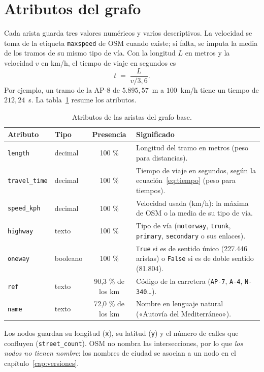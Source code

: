 \section{Atributos del grafo}

Cada arista guarda tres valores numéricos y varios descriptivos. La velocidad se toma de la etiqueta \texttt{maxspeed} de OSM cuando existe; si falta, se imputa la media de los tramos
de su mismo tipo de vía. Con la longitud $L$ en metros y la velocidad $v$ en km/h, el tiempo de viaje en segundos es
\begin{equation}\label{eq:tiempo}
  t\;=\;\frac{L}{v/3{,}6}.
\end{equation}
Por ejemplo, un tramo de la AP-8 de $5.895{,}57$~m a $100$~km/h tiene un tiempo de $212{,}24$~s. La tabla~\ref{tab:atributos} resume los atributos.

\begin{table}[htbp]
  \centering
  \caption{Atributos de las aristas del grafo base.}\label{tab:atributos}
  \small
  \begin{tabularx}{\linewidth}{@{}l l c X@{}}
    \toprule
    Atributo & Tipo & Presencia & Significado \\
    \midrule
    \texttt{length} & decimal & 100 \% & Longitud del tramo en metros (peso para distancias). \\
    \texttt{travel\_time} & decimal & 100 \% & Tiempo de viaje en segundos, según la ecuación~\eqref{eq:tiempo} (peso para tiempos). \\
    \texttt{speed\_kph} & decimal & 100 \% & Velocidad usada (km/h): la máxima de OSM o la media de su tipo de vía. \\
    \texttt{highway} & texto & 100 \% & Tipo de vía (\texttt{motorway}, \texttt{trunk}, \texttt{primary}, \texttt{secondary} o sus enlaces). \\
    \texttt{oneway} & booleano & 100 \% & \texttt{True} si es de sentido único (227.446 aristas) o \texttt{False} si es de doble sentido (81.804). \\
    \texttt{ref} & texto & 90,3 \% de los km & Código de la carretera (\texttt{AP-7}, \texttt{A-4}, \texttt{N-340}\dots). \\
    \texttt{name} & texto & 72,0 \% de los km & Nombre en lenguaje natural («Autovía del Mediterráneo»). \\
    \bottomrule
  \end{tabularx}
\end{table}

Los nodos guardan su longitud (\texttt{x}), su latitud (\texttt{y}) y el número de calles que confluyen (\texttt{street\_count}). OSM no nombra las intersecciones, por lo que
\emph{los nodos no tienen nombre}: los nombres de ciudad se asocian a un nodo en el capítulo~\ref{cap:versiones}.

